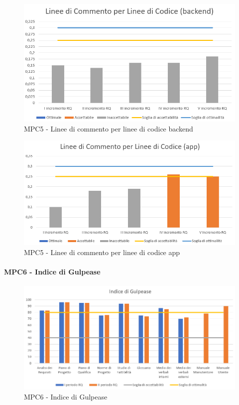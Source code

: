   \begin{figure}[h!]
    \centering
      \includegraphics[scale=1]{Immagini/lineeCommLineeCod BE.PNG}
    \caption{MPC5 - Linee di commento per linee di codice backend}
  \end{figure}

  \begin{figure}[h!]
    \centering
      \includegraphics[scale=1]{Immagini/lineeCommLineeCod APP.PNG}
    \caption{MPC5 - Linee di commento per linee di codice app}
  \end{figure}



  \clearpage
  \paragraph{MPC6 - Indice di Gulpease}
  \begin{figure}[h!]
    \centering
      \includegraphics[scale=1]{Immagini/IndGulp.PNG}
    \caption{MPC6 - Indice di Gulpease}
  \end{figure}



